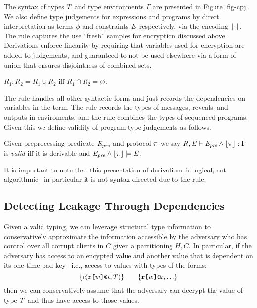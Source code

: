 \cpjfig

The syntax of types $T$ and type environments $\Gamma$ are presented
in Figure \ref{fig-cpj}. We also
define type judgements for expressions and programs by direct
interpretation as terms $\phi$ and constraints $\mathit{E}$ respectively,
via the encoding $\lfloor \cdot \rfloor$. The  rule captures
the use ``fresh'' samples for encryption discussed above. Derivations
enforce linearity by requiring that variables used for encryption
are added to judgements, and guaranteed to not be used elsewhere
via a form of union that ensures disjointness of combined sets. 
\begin{definition}
  $R_1;R_2 = R_1 \cup R_2$ iff $R_1 \cap R_2 = \varnothing$.
\end{definition}
The  rule handles all other syntactic forms and just
records the dependencies on variables in the term.  The 
rule records the types of messages, reveals, and outputs in
enviroments, and the  rule combines the types of
sequenced programs.  Given this we define validity of program type
judgements as follows. 
\begin{definition}
  Given preprocessing predicate $\mathit{E}_{\mathit{pre}}$ and protocol $\pi$ we say
  $R,\mathit{E} \vdash \mathit{E}_{\mathit{pre}} \wedge \lfloor \pi \rfloor : \Gamma$ is \emph{valid} iff it is derivable and
  $\mathit{E}_{\mathit{pre}} \wedge \lfloor \pi \rfloor \models \mathit{E}$.
\end{definition}
It is important to note that this presentation of derivations is
logical, not algorithmic-- in particular it is not syntax-directed
due to the  rule.

\subsection{Detecting Leakage Through Dependencies}

Given a valid typing, we can leverage structural type information to
conservatively approximate the information accessible by the
adversary who has control over all corrupt clients in $C$ given
a partitioning $H,C$. In particular, if the adversary has access to an
encypted value and another value that is dependent on its one-time-pad
key-- i.e., access to values with types of the forms:
$$
\{ c(\texttt{r[}w\texttt{]}\texttt{@}\iota,T) \} \qquad \{ \texttt{r[}w\texttt{]}\texttt{@}\iota, \ldots \} 
$$
then we can conservatively assume that the adversary can decrypt the
value of type $T$ and thus have access to those values.

